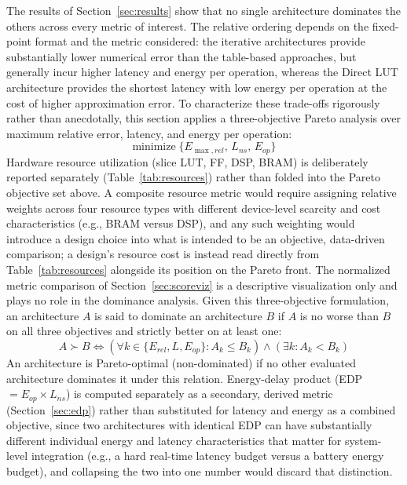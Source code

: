 \documentclass[manuscript,screen,review]{acmart}
\begin{document}
The results of Section~\ref{sec:results} show that no single architecture dominates the others across every metric of interest. The relative ordering depends on the fixed-point format and the metric considered: the iterative architectures provide substantially lower numerical error than the table-based approaches, but generally incur higher latency and energy per operation, whereas the Direct LUT architecture provides the shortest latency with low energy per operation at the cost of higher approximation error. To characterize these trade-offs rigorously rather than anecdotally, this section applies a three-objective Pareto analysis over maximum relative error, latency, and energy per operation:
\begin{equation}
\text{minimize} \; \{ E_{\max,rel},\, L_{ns},\, E_{op} \}
\label{eq:paretomin}
\end{equation}
Hardware resource utilization (slice LUT, FF, DSP, BRAM) is deliberately reported separately (Table~\ref{tab:resources}) rather than folded into the Pareto objective set above. A composite resource metric would require assigning relative weights across four resource types with different device-level scarcity and cost characteristics (e.g., BRAM versus DSP), and any such weighting would introduce a design choice into what is intended to be an objective, data-driven comparison; a design's resource cost is instead read directly from Table~\ref{tab:resources} alongside its position on the Pareto front. The normalized metric comparison of Section~\ref{sec:scoreviz} is a descriptive visualization only and plays no role in the dominance analysis. Given this three-objective formulation, an architecture $A$ is said to dominate an architecture $B$ if $A$ is no worse than $B$ on all three objectives and strictly better on at least one:
\begin{equation}
A \succ B \iff \left(\forall k \in \{E_{rel}, L, E_{op}\} : A_k \le B_k\right) \land \left(\exists k : A_k < B_k\right)
\label{eq:dominance}
\end{equation}
An architecture is Pareto-optimal (non-dominated) if no other evaluated architecture dominates it under this relation. Energy-delay product (EDP $= E_{op} \times L_{ns}$) is computed separately as a secondary, derived metric (Section~\ref{sec:edp}) rather than substituted for latency and energy as a combined objective, since two architectures with identical EDP can have substantially different individual energy and latency characteristics that matter for system-level integration (e.g., a hard real-time latency budget versus a battery energy budget), and collapsing the two into one number would discard that distinction.
\end{document}
